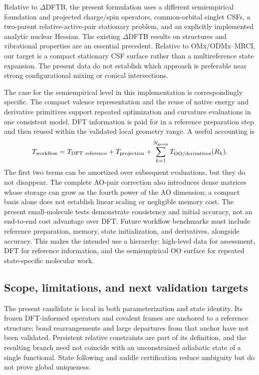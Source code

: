\documentclass[11pt,a4paper]{article}
\begin{document}
Relative to $\Delta$DFTB, the present formulation uses a different semiempirical foundation and projected charge/spin operators, common-orbital singlet CSFs, a two-parent relative-active-pair stationary problem, and an explicitly implemented analytic nuclear Hessian. The existing $\Delta$DFTB results on structures and vibrational properties are an essential precedent.\cite{deltadftb2016} Relative to OMx/ODMx--MRCI, our target is a compact stationary CSF surface rather than a multireference state expansion. The present data do not establish which approach is preferable near strong configurational mixing or conical intersections.

The case for the semiempirical level in this implementation is correspondingly specific. The compact valence representation and the reuse of native energy and derivative primitives support repeated optimization and curvature evaluations in one consistent model. DFT information is paid for in a reference preparation step and then reused within the validated local geometry range. A useful accounting is
\begin{equation}
 T_{\rm workflow}=T_{\rm DFT\ reference}+T_{\rm projection}
 +\sum_{k=1}^{N_{\rm geom}}T_{\rm OO/derivatives}(R_k).
\end{equation}
The first two terms can be amortized over subsequent evaluations, but they do not disappear. The complete AO-pair correction also introduces dense matrices whose storage can grow as the fourth power of the AO dimension; a compact basis alone does not establish linear scaling or negligible memory cost. The present small-molecule tests demonstrate consistency and initial accuracy, not an end-to-end cost advantage over DFT. Future workflow benchmarks must include reference preparation, memory, state initialization, and derivatives, alongside accuracy. This makes the intended use a hierarchy: high-level data for assessment, DFT for reference information, and the semiempirical OO surface for repeated state-specific molecular work.

\subsection{Scope, limitations, and next validation targets}
The present candidate is local in both parameterization and state identity. Its frozen DFT-informed operators and covalent frames are anchored to a reference structure; bond rearrangements and large departures from that anchor have not been validated. Persistent relative constraints are part of its definition, and the resulting branch need not coincide with an unconstrained adiabatic state of a single functional. State following and saddle certification reduce ambiguity but do not prove global uniqueness.
\end{document}

